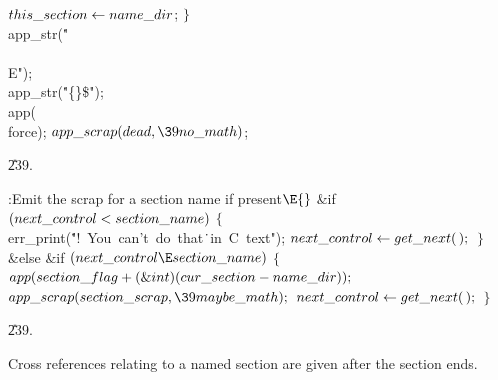 ${}\\{this\_section}\leftarrow\\{name\_dir}{}$;\6
\4${}\}{}$\2\6
\\{app\_str}(\.{"\\\\E"});\6
\\{app\_str}(\.{"\{\}\$"});\6
\\{app}(\\{force});\6
${}\\{app\_scrap}(\\{dead},\39\\{no\_math}){}$;\par
\U239.\fi

\B{}:Emit the scrap for a section name if present\X${}\E{}$\6
\&{if} ${}(\\{next\_control}<\\{section\_name}){}$\5
${}\{{}$\1\6
\\{err\_print}(\.{"!\ You\ can't\ do\ that}\)\.{\ in\ C\ text"});\6
${}\\{next\_control}\leftarrow\\{get\_next}(\,);{}$\6
\4${}\}{}$\2\6
\&{else} \&{if} ${}(\\{next\_control}\E\\{section\_name}){}$\5
${}\{{}$\1\6
${}\\{app}(\\{section\_flag}+(\&{int})(\\{cur\_section}-\\{name\_dir}));{}$\6
${}\\{app\_scrap}(\\{section\_scrap},\39\\{maybe\_math});{}$\6
${}\\{next\_control}\leftarrow\\{get\_next}(\,);{}$\6
\4${}\}{}$\2\par
\U239.\fi

Cross references relating to a named section are given
after the section ends.

